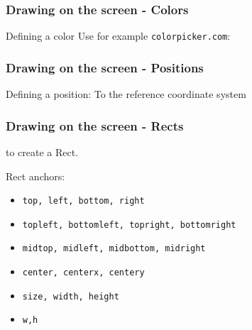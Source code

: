 \documentclass[]{beamer}   %
\newcommand{\source}[1]{\begin{textblock*}{4cm}(8.7cm,8.6cm)
    \begin{beamercolorbox}[ht=0.5cm,right]{framesource}
        \usebeamerfont{framesource}\usebeamercolor[fg]{framesource} Source: {#1}
    \end{beamercolorbox}
\end{textblock*}}
\begin{document}
\begin{frame}
\frametitle{Drawing on the screen - Colors}

Defining a color
\bigskip
\pause
Use for example \textcolor{tg}{\texttt{colorpicker.com}}:
\end{frame}


\begin{frame}
\frametitle{Drawing on the screen - Positions}

Defining a position:
\bigskip
\pause
To the reference coordinate system
\end{frame}


\begin{frame}
\frametitle{Drawing on the screen - Rects}
\rectCode
to create a Rect. 
\pause
\vspace{0.4cm}

\drawRect
\pause 
Rect anchors:
\begin{itemize}
\item[]    \textcolor{tg}{\texttt{top, left, bottom, right}}
\item[]    \textcolor{tg}{\texttt{topleft, bottomleft, topright, bottomright}}
\item[]    \textcolor{tg}{\texttt{midtop, midleft, midbottom, midright}}
\item[]    \textcolor{tg}{\texttt{center, centerx, centery}}
\item[]    \textcolor{tg}{\texttt{size, width, height}}
\item[]    \textcolor{tg}{\texttt{w,h}}
\end{itemize}

\end{frame}
\end{document}

